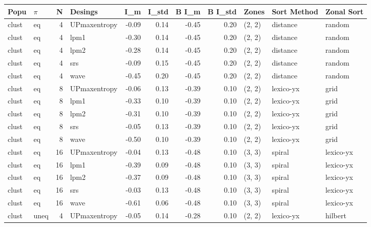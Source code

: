 \begin{tabular}{llrlrrrrlll}
\toprule
  Popu & $\pi$ &  N &      Desings &   I_m &  I_{std} &  B I_m &  B I_{std} &  Zones & Sort Method & Zonal Sort \\
\midrule
 clust &    eq &  4 & UPmaxentropy & -0.09 &     0.14 &  -0.45 &       0.20 & (2, 2) &  distance &     random \\
 clust &    eq &  4 &         lpm1 & -0.30 &     0.14 &  -0.45 &       0.20 & (2, 2) &  distance &     random \\
 clust &    eq &  4 &         lpm2 & -0.28 &     0.14 &  -0.45 &       0.20 & (2, 2) &  distance &     random \\
 clust &    eq &  4 &          srs & -0.09 &     0.15 &  -0.45 &       0.20 & (2, 2) &  distance &     random \\
 clust &    eq &  4 &         wave & -0.45 &     0.20 &  -0.45 &       0.20 & (2, 2) &  distance &     random \\
 clust &    eq &  8 & UPmaxentropy & -0.06 &     0.13 &  -0.39 &       0.10 & (2, 2) &   lexico-yx &       grid \\
 clust &    eq &  8 &         lpm1 & -0.33 &     0.10 &  -0.39 &       0.10 & (2, 2) &   lexico-yx &       grid \\
 clust &    eq &  8 &         lpm2 & -0.31 &     0.10 &  -0.39 &       0.10 & (2, 2) &   lexico-yx &       grid \\
 clust &    eq &  8 &          srs & -0.05 &     0.13 &  -0.39 &       0.10 & (2, 2) &   lexico-yx &       grid \\
 clust &    eq &  8 &         wave & -0.50 &     0.10 &  -0.39 &       0.10 & (2, 2) &   lexico-yx &       grid \\
 clust &    eq & 16 & UPmaxentropy & -0.04 &     0.13 &  -0.48 &       0.10 & (3, 3) &      spiral &  lexico-yx \\
 clust &    eq & 16 &         lpm1 & -0.39 &     0.09 &  -0.48 &       0.10 & (3, 3) &      spiral &  lexico-yx \\
 clust &    eq & 16 &         lpm2 & -0.37 &     0.09 &  -0.48 &       0.10 & (3, 3) &      spiral &  lexico-yx \\
 clust &    eq & 16 &          srs & -0.03 &     0.13 &  -0.48 &       0.10 & (3, 3) &      spiral &  lexico-yx \\
 clust &    eq & 16 &         wave & -0.61 &     0.06 &  -0.48 &       0.10 & (3, 3) &      spiral &  lexico-yx \\
 clust &  uneq &  4 & UPmaxentropy & -0.05 &     0.14 &  -0.28 &       0.10 & (2, 2) &   lexico-yx &    hilbert \\

\end{tabular}
